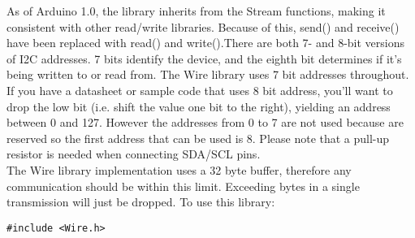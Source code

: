 \documentclass[12pt]{article}
\begin{document}
\hspace*{1 cm}As of Arduino 1.0, the library inherits from the Stream functions, making it consistent with other read/write libraries. Because of this, send() and receive() have been replaced with read() and write().There are both 7- and 8-bit versions of I2C addresses. 7 bits identify the device, and the eighth bit determines if it's being written to or read from. The Wire library uses 7 bit addresses throughout. If you have a datasheet or sample code that uses 8 bit address, you'll want to drop the low bit (i.e. shift the value one bit to the right), yielding an address between 0 and 127. However the addresses from 0 to 7 are not used because are reserved so the first address that can be used is 8. Please note that a pull-up resistor is needed when connecting SDA/SCL pins.\\
\hspace*{1 cm}The Wire library implementation uses a 32 byte buffer, therefore any communication should be within this limit. Exceeding bytes in a single transmission will just be dropped. To use this library:
\begin{lstlisting}[language=Arduino]  
#include <Wire.h>  
\end{lstlisting}
\end{document}
